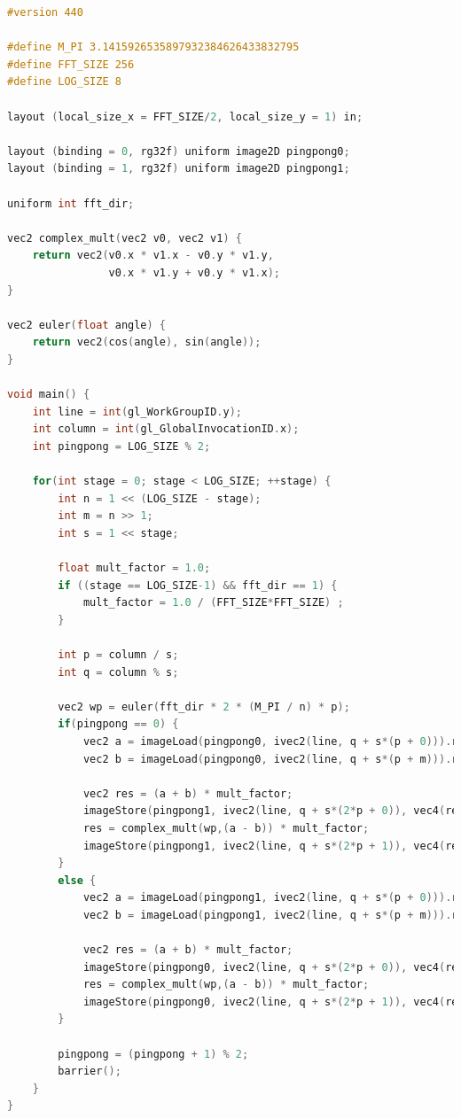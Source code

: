 \documentclass[
  oneside,
  11pt, a4paper,
  footinclude=true,
  headinclude=true,
  cleardoublepage=empty
]{scrbook}
\begin{document}
\begin{lstlisting}[language=C, caption={FFT Radix-2 Stockham Vertical unique pass, see \autoref{sec:radix2-stockham}}, label={lst:glsl-radix2-stockham-vertical}]
#version 440

#define M_PI 3.1415926535897932384626433832795
#define FFT_SIZE 256
#define LOG_SIZE 8

layout (local_size_x = FFT_SIZE/2, local_size_y = 1) in;

layout (binding = 0, rg32f) uniform image2D pingpong0;
layout (binding = 1, rg32f) uniform image2D pingpong1;

uniform int fft_dir;

vec2 complex_mult(vec2 v0, vec2 v1) {
	return vec2(v0.x * v1.x - v0.y * v1.y,
				v0.x * v1.y + v0.y * v1.x);
}

vec2 euler(float angle) {
	return vec2(cos(angle), sin(angle));
}

void main() {
	int line = int(gl_WorkGroupID.y);
	int column = int(gl_GlobalInvocationID.x);
    int pingpong = LOG_SIZE % 2;

    for(int stage = 0; stage < LOG_SIZE; ++stage) {
        int n = 1 << (LOG_SIZE - stage);
        int m = n >> 1;
        int s = 1 << stage;

	    float mult_factor = 1.0;
	    if ((stage == LOG_SIZE-1) && fft_dir == 1) {
	    	mult_factor = 1.0 / (FFT_SIZE*FFT_SIZE) ;
	    }

        int p = column / s;
        int q = column % s;

        vec2 wp = euler(fft_dir * 2 * (M_PI / n) * p);
        if(pingpong == 0) {
            vec2 a = imageLoad(pingpong0, ivec2(line, q + s*(p + 0))).rg;
            vec2 b = imageLoad(pingpong0, ivec2(line, q + s*(p + m))).rg;

            vec2 res = (a + b) * mult_factor;
            imageStore(pingpong1, ivec2(line, q + s*(2*p + 0)), vec4(res,0,0));
            res = complex_mult(wp,(a - b)) * mult_factor;
            imageStore(pingpong1, ivec2(line, q + s*(2*p + 1)), vec4(res,0,0));
        }
        else {
            vec2 a = imageLoad(pingpong1, ivec2(line, q + s*(p + 0))).rg;
            vec2 b = imageLoad(pingpong1, ivec2(line, q + s*(p + m))).rg;

            vec2 res = (a + b) * mult_factor;
            imageStore(pingpong0, ivec2(line, q + s*(2*p + 0)), vec4(res,0,0));
            res = complex_mult(wp,(a - b)) * mult_factor;
            imageStore(pingpong0, ivec2(line, q + s*(2*p + 1)), vec4(res,0,0));
        }

        pingpong = (pingpong + 1) % 2;
        barrier();
    }
}
\end{lstlisting}
\end{document}
